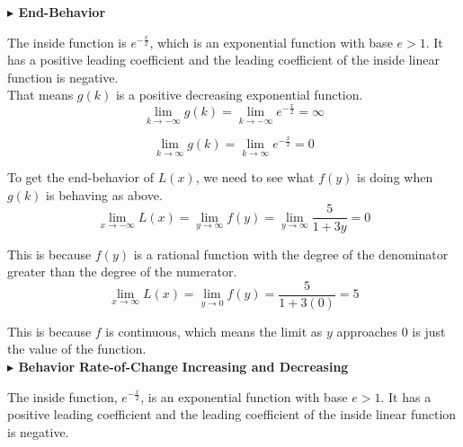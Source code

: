 \documentclass{ximera}
\begin{document}
\begin{example}
\textbf{\textcolor{blue!55!black}{$\blacktriangleright$ End-Behavior}} 


The inside function is $e^{-\tfrac{x}{2}}$, which is an exponential function with base $e > 1$.  It has a positive leading coefficient and the leading coefficient of the inside linear function is negative. \\

That means $g(k)$ is a positive decreasing exponential function. \\



\[  
\lim\limits_{k \to -\infty}g(k) = \lim\limits_{k \to -\infty}e^{-\tfrac{x}{2}} = \infty
\]




\[  
\lim\limits_{k \to \infty}g(k) = \lim\limits_{k \to \infty}e^{-\tfrac{x}{2}} = 0
\]




To get the end-behavior of $L(x)$, we need to see what $f(y)$ is doing when $g(k)$ is behaving as above. \\





\[  
\lim\limits_{x \to -\infty}L(x) = \lim\limits_{y \to \infty}f(y) = \lim\limits_{y \to \infty}\frac{5}{1 + 3 y} = 0
\]

This is because $f(y)$ is a rational function with the degree of the denominator greater than the degree of the numerator. \\






\[  
\lim\limits_{x \to \infty}L(x) = \lim\limits_{y \to 0}f(y) = \frac{5}{1 + 3 (0)} = 5
\]



This is because $f$ is continuous, which means the limit as $y$ approaches $0$ is just the value of the function. \\












\textbf{\textcolor{blue!55!black}{$\blacktriangleright$ Behavior}} 
\textbf{Rate-of-Change}  
\textbf{Increasing and Decreasing}   



The inside function, $e^{-\tfrac{x}{2}}$, is an exponential function with base $e > 1$.  It has a positive leading coefficient and the leading coefficient of the inside linear function is negative. \\



\end{example}
\end{document}

